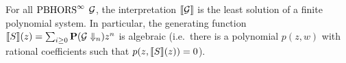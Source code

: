 \documentclass{easychair}
\begin{document}
%
%
\begin{theorem}\label{thm:alg}
For all $\text{PBHORS}^{\infty}$ $\mathcal{G}$, the interpretation $\llbracket\mathcal{G}\rrbracket$ is the least solution of a finite polynomial system.
In particular, the  generating function
$\llbracket S\rrbracket(z)= \sum_{i \geq 0} \mathbf{P}(\mathcal{G} \Downarrow_n)z^n$ is algebraic 
(i.e.~there is a polynomial $p(z, w)$ with rational coefficients such that $p(z, \llbracket S\rrbracket(z))=0$).
\end{theorem}
\end{document}
